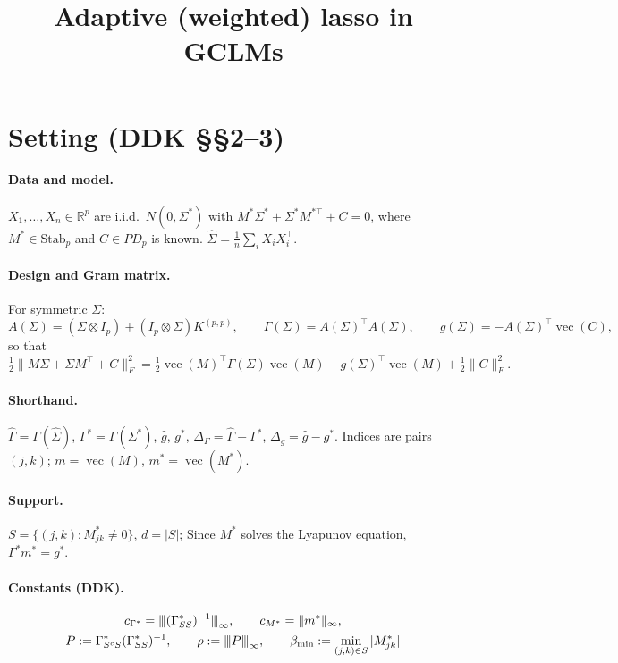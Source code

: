 \documentclass[11pt,a4paper]{article}
\title{\textbf{Adaptive (weighted) lasso in GCLMs}\\[0.4em]}
\author{}
\date{}
\numberwithin{equation}{section}
\theoremstyle{plain}
\theoremstyle{remark}
\newcommand{\opnorm}[1]{{\vert\kern-0.25ex\vert\kern-0.25ex\vert #1 \vert\kern-0.25ex\vert\kern-0.25ex\vert}}
\DeclareMathOperator{\vect}{vec}
\begin{document}
\maketitle

\section{Setting (DDK \S\S2--3)}\label{sec:setting}

\paragraph{Data and model.} $X_1,\dots,X_n\in\mathbb R^p$ are i.i.d.\ $N(0,\Sigma^*)$ with $M^*\Sigma^*+\Sigma^*M^{*\top}+C=0$, where $M^*\in\mathrm{Stab}_p$ and $C\in PD_p$ is known. $\hat\Sigma=\frac1n\sum_iX_iX_i^\top$.

\paragraph{Design and Gram matrix.} For symmetric $\Sigma$:
\[
A(\Sigma)=(\Sigma\otimes I_p)+(I_p\otimes\Sigma)K^{(p,p)},\qquad
\Gamma(\Sigma)=A(\Sigma)^\top A(\Sigma),\qquad
g(\Sigma)=-A(\Sigma)^\top\vect(C),
\]
so that
\[
\tfrac12\|M\Sigma+\Sigma M^\top+C\|_F^2=\tfrac12\vect(M)^\top\Gamma(\Sigma)\vect(M)-g(\Sigma)^\top\vect(M)+\tfrac12\|C\|_F^2 .
\]

\paragraph{Shorthand.} $\hat\Gamma=\Gamma(\hat\Sigma)$, $\Gamma^*=\Gamma(\Sigma^*)$, $\hat g$, $g^*$, $\Delta_\Gamma=\hat\Gamma-\Gamma^*$, $\Delta_g=\hat g-g^*$. Indices are pairs $(j,k)$; $m=\vect(M)$, $m^*=\vect(M^*)$.

\paragraph{Support.} $S=\{(j,k):M^*_{jk}\ne0\}$, $d=|S|$; Since $M^*$ solves the Lyapunov equation, $\Gamma^*m^*=g^*$.

\paragraph{Constants (DDK).}
\begin{gather*}
c_{\Gamma^*}=\opnorm{(\Gamma^*_{SS})^{-1}}_\infty,\qquad c_{M^*}=\|m^*\|_\infty,\\
P:=\Gamma^*_{S^cS}(\Gamma^*_{SS})^{-1},\qquad \rho:=\opnorm{P}_\infty,\qquad \beta_{\min}:=\min_{(j,k)\in S}|M^*_{jk}|
\end{gather*}
\end{document}
